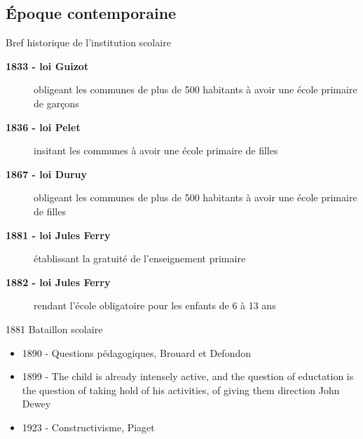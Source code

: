 

\subsection{Époque contemporaine}

\begin{frame}{Bref historique de l'institution scolaire}
\begin{description}
\item[\bf 1833 - loi Guizot] obligeant les communes de plus de 500 habitants à avoir une école primaire de garçons
\item[\bf 1836 - loi Pelet] insitant les communes à avoir une école primaire de filles
\item[\bf 1867 - loi Duruy] obligeant les communes de plus de 500 habitants à avoir une école primaire de filles
\item[\bf 1881 - loi Jules Ferry] établissant la gratuité de l'enseignement primaire
\item[\bf 1882 - loi Jules Ferry] rendant l'école obligatoire pour les enfants de 6 à 13 ans
\end{description}

\end{frame}

\begin{frame}{1881 Bataillon scolaire}
\end{frame}

\begin{frame}
  \begin{itemize}
  \item 1890 - Questions pédagogiques, Brouard et Defondon
  \item 1899 - \og{}The child is already intensely active, and the question 
  of eductation is the question of taking hold of his activities, of 
  giving them direction\fg{} John Dewey
  \item 1923 - Constructivisme, Piaget
  \end{itemize}
  
\end{frame}


